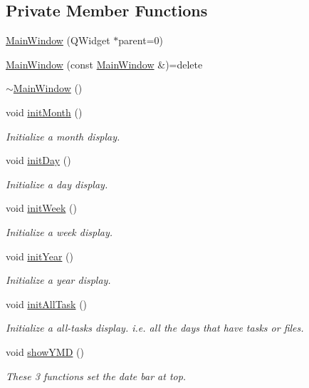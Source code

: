 \subsection*{Private Member Functions}
\begin{DoxyCompactItemize}
\item 
\hyperlink{classMainWindow_a8b244be8b7b7db1b08de2a2acb9409db}{Main\+Window} (Q\+Widget $\ast$parent=0)
\item 
\hyperlink{classMainWindow_af1d822d2183a379458e4bc0e2ea2bf3b}{Main\+Window} (const \hyperlink{classMainWindow}{Main\+Window} \&)=delete
\item 
\hyperlink{classMainWindow_ae98d00a93bc118200eeef9f9bba1dba7}{$\sim$\+Main\+Window} ()
\item 
void \hyperlink{classMainWindow_a6ae0984b3c00fe9253616e9f5aeea6d2}{init\+Month} ()
\begin{DoxyCompactList}\small\item\em Initialize a month display. \end{DoxyCompactList}\item 
void \hyperlink{classMainWindow_adcc14141e6eef45ee903900bb83f8129}{init\+Day} ()
\begin{DoxyCompactList}\small\item\em Initialize a day display. \end{DoxyCompactList}\item 
void \hyperlink{classMainWindow_ae7ea21dab9b67f4a691c798026b61999}{init\+Week} ()
\begin{DoxyCompactList}\small\item\em Initialize a week display. \end{DoxyCompactList}\item 
void \hyperlink{classMainWindow_a8791b87648ba02f9f40ff0e4d820a76a}{init\+Year} ()
\begin{DoxyCompactList}\small\item\em Initialize a year display. \end{DoxyCompactList}\item 
void \hyperlink{classMainWindow_a9019bfe47aed0dd0d9c6647e066eb55e}{init\+All\+Task} ()
\begin{DoxyCompactList}\small\item\em Initialize a all-\/tasks display. i.\+e. all the days that have tasks or files. \end{DoxyCompactList}\item 
void \hyperlink{classMainWindow_aa2a16a8bde8f4d34b1f5c333a7c6041f}{show\+Y\+MD} ()
\begin{DoxyCompactList}\small\item\em These 3 functions set the date bar at top. \end{DoxyCompactList}\item 

\end{DoxyCompactItemize}
